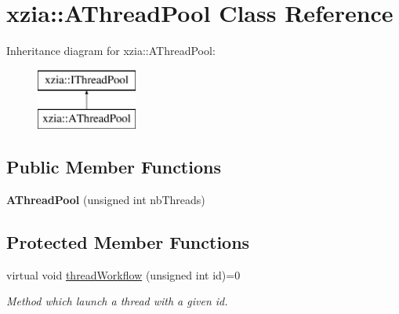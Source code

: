 \hypertarget{classxzia_1_1AThreadPool}{}\section{xzia\+:\+:A\+Thread\+Pool Class Reference}
\label{classxzia_1_1AThreadPool}
Inheritance diagram for xzia\+:\+:A\+Thread\+Pool\+:\begin{figure}[H]
\begin{center}
\leavevmode
\includegraphics[height=2.000000cm]{classxzia_1_1AThreadPool}
\end{center}
\end{figure}
\subsection*{Public Member Functions}
\begin{DoxyCompactItemize}
\item 
\mbox{\label{classxzia_1_1AThreadPool_ab35fcbd9ff967ca953140c1f69d3ff02}} 
{\bfseries A\+Thread\+Pool} (unsigned int nb\+Threads)
\end{DoxyCompactItemize}
\subsection*{Protected Member Functions}
\begin{DoxyCompactItemize}
\item 
virtual void \mbox{\hyperlink{classxzia_1_1AThreadPool_a6c5378fecadb2043b50091f3995dc785}{thread\+Workflow}} (unsigned int id)=0
\begin{DoxyCompactList}\small\item\em Method which launch a thread with a given id. \end{DoxyCompactList}\end{DoxyCompactItemize}
